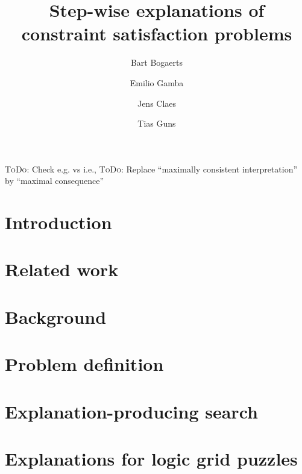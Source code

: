 \documentclass{ecai}
\newcommand\todo[1]{{\color{pink}\textsc{ToDo}: #1}}
\begin{document}
\title{Step-wise explanations of constraint satisfaction problems}

\author{Bart Bogaerts \and Emilio Gamba\footnotemark[1] \and Jens Claes \and Tias Guns\footnotemark[1] }

\maketitle


\begin{abstract}

\end{abstract}

\todo{Check e.g. vs i.e., }
\todo{Replace ``maximally consistent interpretation'' by ``maximal consequence''}


\section{Introduction}


\section{Related work}


\section{Background}


\section{Problem definition}



\section{Explanation-producing search}\label{sec:expl-gen-prod}



\section{Explanations for logic grid puzzles}

\end{document}
